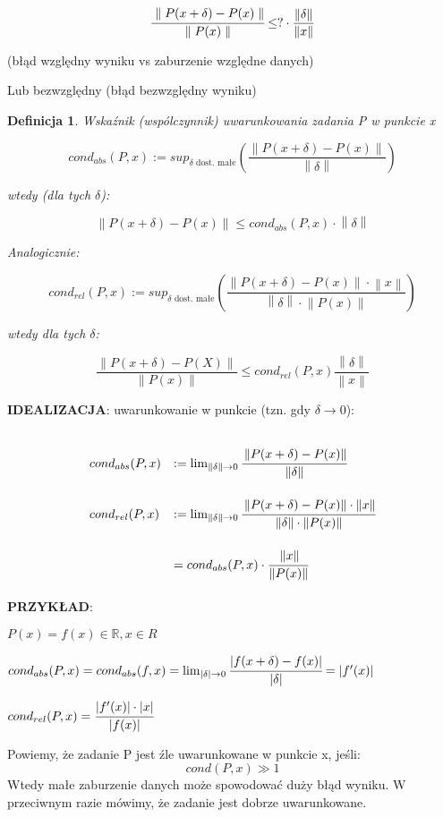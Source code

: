 \documentclass[hidelinks,a4paper]{article}
\newcommand{\RR}{\mathbb{R}}
\newcommand{\ra}{\rightarrow}
\newcommand{\norm}[1]{\left\lVert#1\right\rVert}
\newtheorem{defi}{Definicja}
\begin{document}
\[
	\cfrac{\parallel P(x + \delta) - P(x) \parallel}{\parallel P(x) \parallel} \leq ? \cdot \frac{\norm{\delta}}{\norm{x}}
\]

(błąd względny wyniku vs zaburzenie względne danych)

Lub bezwzględny (błąd bezwzględny wyniku)


\begin{defi}
	Wskaźnik (wspólczynnik) uwarunkowania zadania P w punkcie x
	
	\[
		cond_{abs}(P, x) := sup_{\delta\textrm{ dost. małe}}\left(\frac{\norm{P(x + \delta) - P(x)}}{\norm{\delta}}\right)
	\]
	
	wtedy (dla tych $\delta$):
	
	\[
		\norm{P(x + \delta) - P(x)} \leq cond_{abs} (P, x) \cdot \norm{\delta}
	\]
	
	Analogicznie:
	
	\[
		cond_{rel}(P, x) := sup_{\delta\textrm{ dost. małe}}\left(\frac{\norm{P(x + \delta) - P(x)} \cdot \norm{x}}{\norm{\delta} \cdot \norm{P(x)}}\right)
	\]
	
	wtedy dla tych $\delta$:
	
	\[
		\frac{\norm{P(x + \delta) - P(X)}}{\norm{P(x)}} \leq cond_{rel} (P, x) \frac{\norm{\delta}}{\norm{x}}
	\]
	
\end{defi}

\textbf{IDEALIZACJA}: uwarunkowanie w punkcie (tzn. gdy $\delta \ra 0$):

\[\def\arraystretch{3.4}
	\begin{array}{ll}
		cond_{abs}(P, x) & := \lim_{\norm{\delta} \ra 0} \cfrac{\norm{P(x + \delta) - P(x)}}{\norm{\delta}} \\
		cond_{rel}(P, x) & := \lim_{\norm{\delta} \ra 0} \cfrac{\norm{P(x + \delta) - P(x)} \cdot \norm{x}}{\norm{\delta} \cdot \norm{P(x)}} \\ & = cond_{abs} (P, x) \cdot \cfrac{\norm{x}}{\norm{P(x)}}
	\end{array}
\]

\textbf{PRZYKŁAD}:

$P(x) = f(x) \in \RR, x \in R$

$cond_{abs} (P, x) = cond_{abs}(f, x) = \lim_{| \delta | \ra 0} \cfrac{| f(x + \delta) - f(x)|}{| \delta |} = |f'(x)|$

$cond_{rel}(P, x) = \cfrac{|f'(x)| \cdot |x|}{|f(x)|}$

Powiemy, że zadanie P jest źle uwarunkowane w punkcie x, jeśli:
\[
	cond(P, x) \gg 1
\]
Wtedy małe zaburzenie danych może spowodować duży błąd wyniku. W przeciwnym razie mówimy, że zadanie jest dobrze uwarunkowane.
\end{document}
